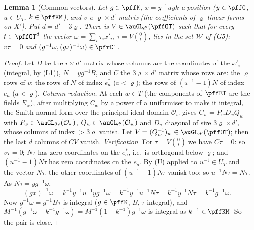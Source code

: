 \documentclass[10pt]{amsart}
\newtheorem{lemma}[theorem]{Lemma}
\theoremstyle{definition}
\theoremstyle{remark}
\providecommand{\auO}{\mathcal O}
\begin{document}
\begin{lemma}[Common vectors]\label{pfg:common}
Let $g\in\pffK$, $x=y^{-1}uyk$ a position ($y\in\pffG$, $u\in U_T$, $k\in\pffKM$), and $v$ a $\varrho\times d'$ matrix
(the coefficients of $\varrho$ linear forms on $X'$). Put $d=d'-3\varrho$. There is $V\in\auGL_{d'}(\pffOT)$ such that for
every $t\in\pffOT^{d}$ the vector $\omega=\sum_i\tau_ix'_i$, $\tau=V\binom0t$, lies in the set $\mathcal W$ of (G5):
$v\tau=0$ and $(g^{-1}\omega,(gx)^{-1}\omega)\in\pfrCl$.
\end{lemma}
\begin{proof}
Let $B$ be the $r\times d'$ matrix whose columns are the coordinates of the $x'_i$ (integral, by (L1)), $N=yg^{-1}B$,
and $C$ the $3\varrho\times d'$ matrix whose rows are: the $\varrho$ rows of $v$; the rows of $N$ of index $e^*_a$
($a<\varrho$); the rows of $(u^{-1}-1)N$ of index $e_a$ ($a<\varrho$). \emph{Column reduction.} At each $w\in T$ (the
components of $\pffET$ are the fields $E_w$), after multiplying $C_w$ by a power of a uniformiser to make it integral,
the Smith normal form over the principal ideal domain $\auO_w$ gives $C_w=P_wD_wQ_w$ with $P_w\in\auGL_{3\varrho}(\auO_w)$,
$Q_w\in\auGL_{d'}(\auO_w)$ and $D_w$ diagonal of size $3\varrho\times d'$, whose columns of index $>3\varrho$ vanish. Let
$V=(Q_w^{-1})_w\in\auGL_{d'}(\pffOT)$; then the last $d$ columns of $CV$ vanish. \emph{Verification.} For
$\tau=V\binom0t$ we have $C\tau=0$: so $v\tau=0$; $N\tau$ has zero coordinates on the $e^*_a$, i.e.\ is orthogonal
below $\varrho$; and $(u^{-1}-1)N\tau$ has zero coordinates on the $e_a$. By (U) applied to $u^{-1}\in U_T$ and the
vector $N\tau$, the other coordinates of $(u^{-1}-1)N\tau$ vanish too; so $u^{-1}N\tau=N\tau$. As $N\tau=yg^{-1}\omega$,
\[
(gx)^{-1}\omega=k^{-1}y^{-1}u^{-1}yg^{-1}\omega=k^{-1}y^{-1}u^{-1}N\tau=k^{-1}y^{-1}N\tau=k^{-1}g^{-1}\omega .
\]
Now $g^{-1}\omega=g^{-1}B\tau$ is integral ($g\in\pffK$, $B$, $\tau$ integral), and $M^{-1}(g^{-1}\omega-k^{-1}g^{-1}\omega)
=M^{-1}(1-k^{-1})g^{-1}\omega$ is integral as $k^{-1}\in\pffKM$. So the pair is close.
\end{proof}
\end{document}
